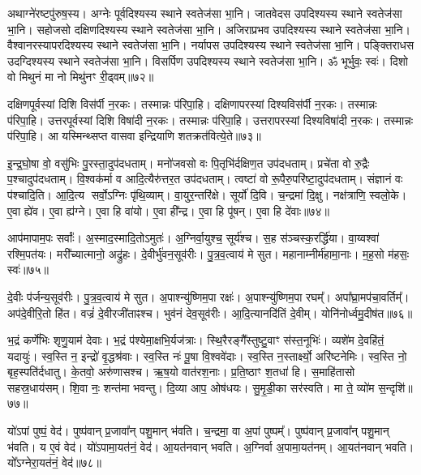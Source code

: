 अथाग्ने॑रष्टपु॑रुष॒स्य। 
अग्नेः पूर्वदिश्यस्य स्थाने स्वतेज॑सा भा॒नि। 
जातवेदस उपदिश्यस्य स्थाने स्वतेज॑सा भा॒नि। 
सहोजसो दक्षिणदिश्यस्य स्थाने स्वतेज॑सा भा॒नि। 
अजिराप्रभव उपदिश्यस्य स्थाने स्वतेज॑सा भा॒नि। 
वैश्वानरस्यापरदिश्यस्य स्थाने स्वतेज॑सा भा॒नि। 
नर्यापस उपदिश्यस्य स्थाने स्वतेज॑सा भा॒नि। 
पङ्क्तिराधस उदग्दिश्यस्य स्थाने स्वतेज॑सा भा॒नि। 
विसर्पिण उपदिश्यस्य स्थाने स्वतेज॑सा भा॒नि। 
ॐ भूर्भुवः॒ स्वः॑। दिशो वो मिथुनं मा नो मिथु॑नꣳ री॒ढ्वम्॥७२॥\anuvakamend


दक्षिणपूर्वस्यां दिशि विस॑र्पी न॒रकः। तस्मान्नः प॑रिपा॒हि। 
दक्षिणापरस्यां दिश्यविस॑र्पी न॒रकः। तस्मान्नः प॑रिपा॒हि। 
उत्तरपूर्वस्यां दिशि विषा॑दी न॒रकः। तस्मान्नः प॑रिपा॒हि। 
उत्तरापरस्यां दिश्यविषा॑दी न॒रकः। तस्मान्नः प॑रिपा॒हि। 
आ यस्मिन्थ्सप्त वासवा इन्द्रियाणि शतक्रत॑वित्ये॒ते॥७३॥\anuvakamend


इ॒न्द्र॒घो॒षा वो॒ वसु॑भिः पु॒रस्ता॒दुप॑दधताम्। 
मनो॑जवसो वः पि॒तृभि॑र्दक्षिण॒त उप॑दधताम्। 
प्रचे॑ता वो रु॒द्रैः प॒श्चादुप॑दधताम्। 
वि॒श्वक॑र्मा व आदि॒त्यैरु॑त्तर॒त उप॑दधताम्। 
त्वष्टा॑ वो रू॒पैरु॒परि॑ष्टा॒दुप॑\-दधताम्। 
संज्ञानं वः प॑श्चादि॒ति। आ॒दि॒त्य सर्वो॒ऽग्निः पृ॑थि॒व्याम्। 
वा॒युर॒न्तरि॑क्षे। सूर्यो॑ दि॒वि। च॒न्द्रमा॑ दि॒क्षु। 
नक्ष॑त्राणि॒ स्वलो॒के। ए॒वा ह्ये॑व। ए॒वा ह्य॑ग्ने। 
ए॒वा हि वा॑यो। ए॒वा ही᳚न्द्र। ए॒वा हि पू॑षन्। ए॒वा हि दे॑वाः॥७४॥\anuvakamend


आप॑मापाम॒पः सर्वाः᳚। अ॒स्माद॒स्मादि॒तोऽमुतः॑।
अ॒ग्निर्वा॒युश्च॒ सूर्य॑श्च। स॒ह स॑ञ्चस्क॒रर्द्धि॑या। 
वा॒य्वश्वा॑ रश्मि॒पत॑यः। मरी᳚च्यात्मानो॒ अद्रु॑हः। 
दे॒वीर्भु॑वन॒सूव॑रीः। पु॒त्र॒व॒त्वाय॑ मे सुत। 
महानाम्नीर्म॑हा\-मा॒नाः। म॒ह॒सो म॑हसः॒ स्वः॑॥७५॥


दे॒वीः प॑र्जन्य॒सूव॑रीः। पु॒त्र॒व॒त्वाय॑ मे सुत। 
अ॒पा\-श्न्यु॑ष्णिम॒पा रक्षः॑। अ॒पा\-श्न्यु॑ष्णि\-म॒पा रघम्᳚। 
अपा᳚घ्रा॒मप॑चा॒वर्तिम्᳚। अप॑दे॒वीरि॒तो हि॑त। 
वज्रं॑ दे॒वी\-रजी॑ताꣴश्च। भुव॑नं देव॒सूव॑रीः। 
आ॒दि॒त्यानदि॑तिं दे॒वीम्। योनि॑नोर्ध्वमु॒दीष॑त॥७६॥


भ॒द्रं कर्णे॑भिः शृणु॒याम॑ देवाः। भ॒द्रं प॑श्येमा॒क्षभि॒र्यज॑त्राः। 
स्थि॒रैरङ्गै᳚स्तुष्टु॒\-वाꣳ स॑स्त॒नूभिः॑। व्यशे॑म दे॒वहि॑तं॒ यदायुः॑। 
स्व॒स्ति न॒ इन्द्रो॑ वृ॒द्धश्र॑वाः। स्व॒स्ति नः॑ पू॒षा वि॒श्ववे॑दाः। 
स्व॒स्ति न॒स्तार्क्ष्यो॒ अरि॑ष्टनेमिः। स्व॒स्ति नो॒ बृह॒स्पति॑र्दधातु। 
के॒तवो॒ अरु॑णासश्च। ऋ॒ष॒यो वात॑रश॒नाः। 
प्र॒ति॒ष्ठाꣳ श॒तधा॑ हि। स॒माहि॑तासो सहस्र॒धाय॑सम्। 
शि॒वा नः॒ शन्त॑मा भवन्तु। दि॒व्या आप॒ ओष॑धयः। 
सु॒मृ॒डी॒का सर॑स्वति। मा ते॒ व्यो॑म स॒न्दृशि॑॥७७॥\anuvakamend


यो॑ऽपां पुष्पं॒ वेद॑। पुष्प॑वान्‌ प्र॒जावा᳚न् पशु॒मान् भ॑वति। 
च॒न्द्रमा॒ वा अ॒पां पुष्पम्᳚। पुष्प॑वान् प्र॒जावा᳚न् पशु॒मान्‌ भ॑वति। 
य ए॒वं वेद॑। यो॑ऽपामा॒यत॑नं॒ वेद॑। 
आ॒यत॑नवान्‌ भवति। अ॒ग्निर्वा अ॒पामा॒यत॑नम्। 
आ॒यत॑नवान्‌ भवति। यो᳚ऽग्नेरा॒यत॑नं॒ वेद॑॥७८॥


